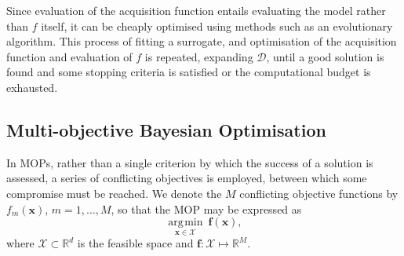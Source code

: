 \documentclass[conference]{IEEEtran}
\newcommand{\parameterspace}{\mathcal{X}}
\newcommand{\ndim}{d}
\newcommand{\nobj}{M}
\DeclareMathOperator*{\argmin}{\arg\!\min}
\newcommand\mX{\mathcal{X}}
\newcommand{\bx}{\mathbf{x}}
\begin{document}
 Since evaluation of the acquisition function entails evaluating the model
 rather than $f$ itself, it can be  cheaply optimised using methods such as
 an evolutionary algorithm. 
 This process of fitting a surrogate,
 and optimisation of the acquisition function and evaluation of $f$ is
 repeated, expanding $\mathcal{D}$, until a good solution is found and some
 stopping criteria is satisfied or the computational budget is exhausted.
 
 

\subsection{Multi-objective Bayesian Optimisation}\label{section:background_MOPs}
In MOPs, rather than a single criterion by which the success of a solution is assessed, a series of conflicting objectives is employed, between which some compromise must be reached. We denote the $\nobj$ conflicting objective functions by $f_m(\bx)$, $m = 1, \ldots, \nobj$, so that the MOP may be expressed 
as 
\begin{equation}\label{eqn: min_F}
\underset{\mathbf{x} \in \mX}{\argmin}\:\mathbf{f}(\mathbf{x}), 
\end{equation}
where $\parameterspace \subset \mathbb{R}^\ndim$ is the feasible space and $\mathbf{f}: \parameterspace \mapsto \mathbb{R}^{\nobj}$.
\end{document}
